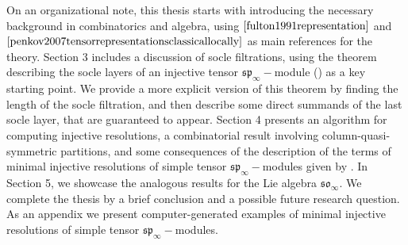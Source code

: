 \documentclass[main.tex]{subfiles}
\begin{document}
On an organizational note, this thesis starts with introducing the necessary background in combinatorics and algebra, using $\cite{fulton1991representation}$ and $\cite{penkov2007tensorrepresentationsclassicallocally}$ as main references for the theory. Section 3 includes a discussion of socle filtrations, using the theorem describing the socle layers of an injective tensor
$\mathfrak{sp}_\infty-$module (\cite{penkov2007tensorrepresentationsclassicallocally}) as a key starting point. We provide a more explicit version of this theorem by finding the length of the socle filtration, and then describe some direct summands of the last socle layer, that are guaranteed to appear. Section 4 presents an algorithm for computing injective resolutions, a combinatorial result involving column-quasi-symmetric partitions, and some consequences of the description of the terms of minimal injective resolutions of simple tensor $\mathfrak{sp}_\infty-$modules given by \cite{SAM_2015}. In Section 5, we showcase the analogous results for the Lie algebra $\mathfrak{so}_\infty.$ We complete the thesis by a brief conclusion and a possible future research question.\\

As an appendix we present computer-generated examples of minimal injective resolutions of simple tensor $\mathfrak{sp}_\infty-$modules.
\bigskip                                                                     
\end{document}
